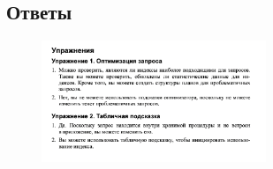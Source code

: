 \subsection*{Ответы}

\begin{figure}[h!]
	\begin{center}
		\includegraphics[width=0.6\textwidth]{img/eans50.png}
	\end{center}
	\captionsetup{justification=centering}
\end{figure}